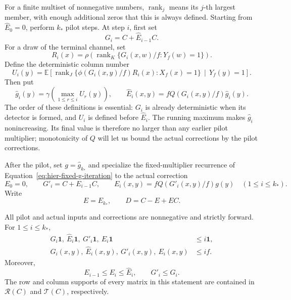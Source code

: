 For a finite multiset of nonnegative numbers, $\operatorname{rank}_j$
means its $j$-th largest member, with enough additional zeros that this is
always defined.  Starting from $\widehat E_0=0$, perform $k_*$ pilot
steps.  At step $i$, first set
\begin{equation}
 G_i=C+\widehat E_{i-1}C.
 \label{eq:hier-pilot-input}
\end{equation}
For a draw of the terminal channel, set
\begin{equation}
 R_i(x)=\rho\left(\operatorname{rank}_K
       \{G_i(x,w)/f:Y_f(w)=1\}\right).
 \label{eq:hier-pilot-row-gate}
\end{equation}
Define the deterministic column number
\begin{equation}
 U_i(y)=\mathbb E\left[
    \operatorname{rank}_J
       \{\phi(G_i(x,y)/f)R_i(x):X_f(x)=1\}
       \,\middle|\,Y_f(y)=1\right].
 \label{eq:hier-detector}
\end{equation}
Then put
\begin{equation}
 \widehat g_i(y)=\gamma\left(\max_{1\leq r\leq i}U_r(y)\right),
 \qquad
 \widehat E_i(x,y)=fQ(G_i(x,y)/f)\widehat g_i(y).
 \label{eq:hier-pilot-correction}
\end{equation}
The order of these definitions is essential: $G_i$ is already
deterministic when its detector is formed, and $U_i$ is defined before
$\widehat E_i$.  The running maximum makes $\widehat g_i$ nonincreasing.
Its final value is therefore no larger than any earlier pilot multiplier;
monotonicity of $Q$ will let us bound the actual corrections by the pilot
corrections.

After the pilot, set $g=\widehat g_{k_*}$ and specialize the fixed-multiplier
recurrence of Equation~\eqref{eq:hier-fixed-g-iteration} to the actual correction
\begin{equation}
 E_0=0,\qquad G'_i=C+E_{i-1}C,\qquad
 E_i(x,y)=fQ(G'_i(x,y)/f)g(y)\quad(1\leq i\leq k_*).
 \label{eq:hier-actual-iteration}
\end{equation}
Write
\begin{equation}
 E=E_{k_*},\qquad D=C-E+EC.
 \label{eq:hier-residual-definition}
\end{equation}

\begin{lemma}
\label{lem:hier-pilot-bounds}
All pilot and actual inputs and corrections are nonnegative and strictly
forward.  For $1\leq i\leq k_*$,
\begin{align*}
 G_i\mathbf 1,\ \widehat E_i\mathbf 1,
     \ G'_i\mathbf 1,\ E_i\mathbf 1&\leq i\mathbf 1,\\
 G_i(x,y),\ \widehat E_i(x,y),
     \ G'_i(x,y),\ E_i(x,y)&\leq if.
\end{align*}
Moreover,
\[
 E_{i-1}\leq E_i\leq\widehat E_i,
 \qquad G'_i\leq G_i.
\]
The row and column supports of every matrix in this statement are
contained in $\mathcal R(C)$ and $\mathcal T(C)$, respectively.
\end{lemma}

